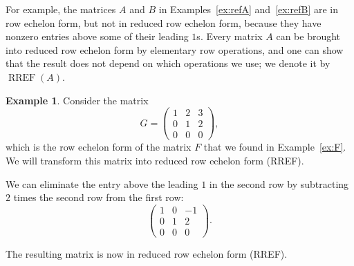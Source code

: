 \documentclass[11pt]{article}
\theoremstyle{definition}
\newtheorem{example}[definition]{Example}
\theoremstyle{plain}
\theoremstyle{remark}
\DeclareMathOperator{\RREF}{RREF}
\begin{document}
For example, the matrices $A$ and $B$ in Examples~\ref{ex:refA} and~\ref{ex:refB} are in row echelon form, but not in reduced row echelon form, because they have nonzero entries above some of their leading $1$s. Every matrix $A$ can be brought into reduced row echelon form by elementary row operations, and one can show that the result does not depend on which operations we use; we denote it by $\RREF(A)$.

\begin{example}\label{ex:G}
    Consider the matrix
    \[G = \begin{pmatrix}
        1 & 2 & 3 \\
        0 & 1 & 2 \\
        0 & 0 & 0
    \end{pmatrix},\]
    which is the row echelon form of the matrix $F$ that we found in Example~\ref{ex:F}. We will transform this matrix into reduced row echelon form (RREF).

    We can eliminate the entry above the leading $1$ in the second row by subtracting $2$ times the second row from the first row:
    \[\begin{pmatrix}
        1 & 0 & -1 \\
        0 & 1 & 2 \\
        0 & 0 & 0
    \end{pmatrix}.\]

    The resulting matrix is now in reduced row echelon form (RREF).
\end{example}
\end{document}
